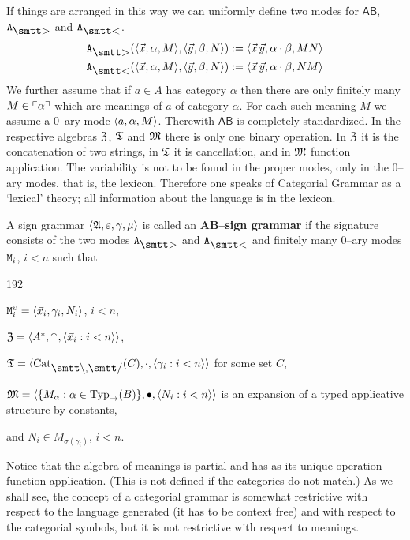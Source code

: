 If things are arranged in this way we can uniformly define two
modes for $\mathsf{AB}$, $\mbox{\tt A}_{\sgr}$ and
$\mbox{\tt A}_{\skl}$.
\begin{subequations}
\begin{align}
\mbox{\tt A}_{\sgr}(\auf \vec{x}, \alpha, M\zu,
    \auf \vec{y}, \beta, N\zu)
    & := \auf \vec{x}\, \vec{y}, \alpha \cdot \beta,
    MN\zu \\
\mbox{\tt A}_{\skl}(\auf \vec{x}, \alpha, M\zu,
    \auf \vec{y}, \beta, N\zu)
    & := \auf \vec{x}\, \vec{y}, \alpha \cdot \beta, NM\zu
    \end{align}
\end{subequations}
We further assume that if $a \in A$ has category $\alpha$
then there are only finitely many $M \in \ulcorner\alpha\urcorner$ which are
meanings of $a$ of category $\alpha$. For each such meaning
$M$ we assume a 0--ary mode $\langle a, \alpha, M\rangle$. Therewith
$\mathsf{AB}$ is completely standardized. In the respective 
algebras $\mathfrak{Z}$, $\mathfrak{T}$ and $\mathfrak{M}$ there is only one binary operation. 
In $\mathfrak{Z}$ it is the concatenation of two strings, in $\mathfrak{T}$ it is 
cancellation, and in $\mathfrak{M}$ function application. The variability 
is not to be found in the proper modes, only in the 0--ary 
modes, that is, the lexicon. Therefore one speaks of Categorial 
Grammar as a `lexical' theory; all information about the
language is in the lexicon.
\begin{defn}
A sign grammar $\langle \mathfrak{A}, \varepsilon, \gamma, \mu\rangle$ is called 
an \textbf{AB--sign grammar} if the signature consists of the two 
modes $\mbox{\tt A}_{\sgr}$ and $\mbox{\tt A}_{\skl}$  and finitely
many 0--ary modes $\mbox{\tt M}_i$, $i < n$ such that 
\begin{dingautolist}{192}
\item
$\mbox{\tt M}_i^{\upsilon} = \langle \vec{x}_i, \gamma_i, N_i\rangle$, 
$i < n$,
\item
$\mathfrak{Z} = \langle A^{\ast}, {^{\smallfrown}}, \langle \vec{x}_i : i < n\rangle\rangle$,
\item
$\GT = \auf \Cat_{\mbox{\smtt\tb},\mbox{\smtt\tf}}(C), \cdot, 
\auf \gamma_i : i < n\zu\zu$ for some set $C$,
\item
$\mathfrak{M} = \langle \{M_{\alpha} : \alpha \in 
\operatorname{Typ}_{\rightarrow}(B)\}, \bullet, \langle N_i : i < n\rangle\rangle$ 
is an expansion of a typed applicative structure by constants, 
\item
and $N_i \in M_{\sigma(\gamma_i)}$, $i <n$.
\end{dingautolist}
\end{defn}
Notice that the algebra of meanings is partial and has as its 
unique operation function application. (This is not defined if 
the categories do not match.) As we shall see, the concept of 
a categorial grammar is somewhat restrictive with respect to 
the language generated (it has to be context free) and with 
respect to the categorial symbols, but it is not restrictive 
with respect to meanings. 


